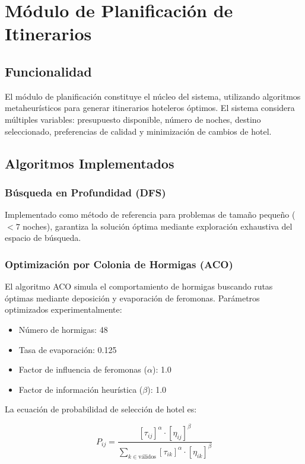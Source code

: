 \documentclass[runningheads]{llncs}
\begin{document}
\section{Módulo de Planificación de Itinerarios}

\subsection{Funcionalidad}

El módulo de planificación constituye el núcleo del sistema, utilizando algoritmos metaheurísticos para generar itinerarios hoteleros óptimos. El sistema considera múltiples variables: presupuesto disponible, número de noches, destino seleccionado, preferencias de calidad y minimización de cambios de hotel.

\subsection{Algoritmos Implementados}

\subsubsection{Búsqueda en Profundidad (DFS)}

Implementado como método de referencia para problemas de tamaño pequeño ($< 7$ noches), garantiza la solución óptima mediante exploración exhaustiva del espacio de búsqueda.


\subsubsection{Optimización por Colonia de Hormigas (ACO)}

El algoritmo ACO simula el comportamiento de hormigas buscando rutas óptimas mediante deposición y evaporación de feromonas. Parámetros optimizados experimentalmente:

\begin{itemize}
\item Número de hormigas: 48
\item Tasa de evaporación: 0.125
\item Factor de influencia de feromonas ($\alpha$): 1.0
\item Factor de información heurística ($\beta$): 1.0
\end{itemize}

La ecuación de probabilidad de selección de hotel es:

\begin{equation}
P_{ij} = \frac{[\tau_{ij}]^{\alpha} \cdot [\eta_{ij}]^{\beta}}{\sum_{k \in \text{válidos}}[\tau_{ik}]^{\alpha} \cdot [\eta_{ik}]^{\beta}}
\end{equation}
\end{document}
